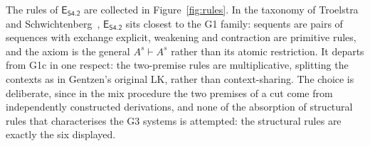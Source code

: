 \documentclass{article}
\newcommand{\seq}[2]{{#1} \vdash{} {#2}}
\newcommand{\pf}[2]{{#1}^{#2}} %
\newcommand{\eseq}{\mathsf{E}_{{\textsf{S4.2}}}}
\theoremstyle{definition}
\begin{document}
The rules of $\eseq$ are collected in Figure~\ref{fig:rules}. In the taxonomy of Troelstra and Schwichtenberg~\cite{Troelstra2000:BasicProofTheory}, $\eseq$ sits closest to the \textsf{G1} family: sequents are pairs of sequences with exchange explicit, weakening and contraction are primitive rules, and the axiom is the general $\seq{\pf{A}{s}}{\pf{A}{s}}$ rather than its atomic restriction. It departs from \textsf{G1c} in one respect: the two-premise rules are multiplicative, splitting the contexts as in Gentzen's original \textsf{LK}, rather than context-sharing. The choice is deliberate, since in the mix procedure the two premises of a cut come from independently constructed derivations, and none of the absorption of structural rules that characterises the \textsf{G3} systems is attempted: the structural rules are exactly the six displayed.
\end{document}
